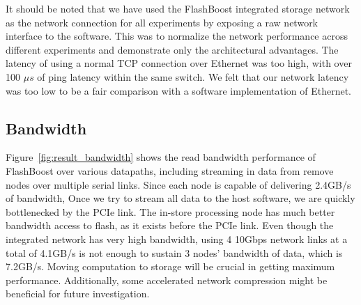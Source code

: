 It should be noted that we have used the FlashBoost integrated storage network
as the network connection for all experiments by exposing a raw network
interface to the software. This was to normalize the network performance across
different experiments and demonstrate only the architectural advantages. The
latency of using a normal TCP connection over Ethernet was too high, with over 100
$\mu s$ of ping latency within the same switch.  We felt that our network
latency was too low to be a fair comparison with a software implementation
of Ethernet.

%
%


\subsection{Bandwidth}

Figure~\ref{fig:result_bandwidth} shows the read bandwidth performance of
FlashBoost over various datapaths, including streaming in data from remove nodes
over multiple serial links. Since each node is capable of delivering 2.4GB/s of
bandwidth, Once we try to stream all data to the
host software, we are quickly bottlenecked by the PCIe link. The in-store
processing node has much better bandwidth access to flash, as it exists before
the PCIe link. Even though the integrated network has very high bandwidth, 
using 4 10Gbps network links at a total of 4.1GB/s is not enough to sustain 3 nodes' bandwidth of
data, which is 7.2GB/s. Moving computation to storage will be crucial in getting
maximum performance.
Additionally, some accelerated network compression might be beneficial for future
investigation.


